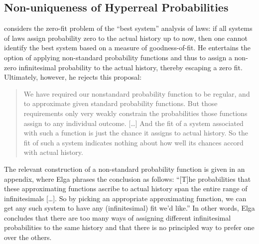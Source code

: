 \subsection{Non-uniqueness of Hyperreal Probabilities}
\citet{Elga:2004} considers the zero-fit problem of the ``best system'' analysis of laws: if all systems of laws assign probability zero to the actual history up to now, then one cannot identify the best system based on a measure of goodness-of-fit. He entertains the option of applying non-standard probability functions and thus to assign a non-zero infinitesimal probability to the actual history, thereby escaping a zero fit. Ultimately, however, he rejects this proposal:
\begin{quote}
We have required our nonstandard probability function to be regular, and to approximate given standard probability functions. But those requirements only very weakly constrain the probabilities those functions assign to any individual outcome. [\ldots] And the fit of a system associated with such a function is just the chance it assigns to actual history. So the fit of such a system indicates nothing about how well its chances accord with actual history.
\end{quote}
The relevant construction of a non-standard probability function is given in an appendix, where Elga phrases the conclusion as follows:
``[T]he probabilities that these approximating functions ascribe to actual history span the entire range of infinitesimals [\ldots]. So by picking an appropriate approximating function, we can get any such system to have any (infinitesimal) fit we'd like.''
In other words, Elga concludes that there are too many ways of assigning different infinitesimal probabilities to the same history and that there is no principled way to prefer one over the others.

